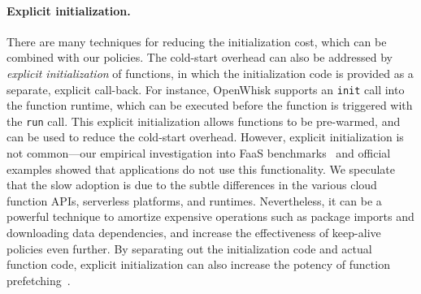 \paragraph{Explicit initialization.}
There are many techniques for reducing the initialization cost, which can be combined with our policies. 
The cold-start overhead can also be addressed by \emph{explicit initialization} of functions, in which the initialization code is provided as a separate, explicit call-back. 
For instance, OpenWhisk supports an \texttt{init} call into the function runtime, which can be executed before the function is triggered with the \texttt{run} call. 
This explicit initialization allows functions to be pre-warmed, and can be used to reduce the cold-start overhead.  
However, explicit initialization is not common---our empirical investigation into FaaS benchmarks~\cite{kim_functionbench_2019} and official examples showed that applications do not use this functionality. 
We speculate that the slow adoption is due to the subtle differences in the various cloud function APIs, serverless platforms, and runtimes. 
Nevertheless, it can be a powerful technique to amortize expensive operations such as package imports and downloading data dependencies, and increase the effectiveness of keep-alive policies even further.
By separating out the initialization code and actual function code, explicit initialization can also increase the potency of function prefetching~\cite{shahrad_serverless_2020}. 


